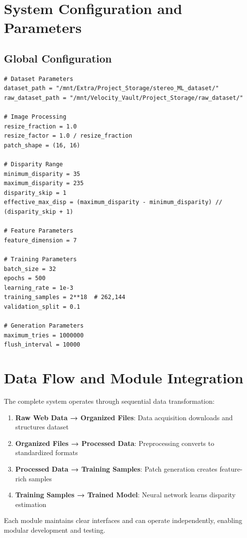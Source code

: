 \documentclass[12pt]{article}
\begin{document}
\section{System Configuration and Parameters}

\subsection{Global Configuration}

\begin{verbatim}
# Dataset Parameters
dataset_path = "/mnt/Extra/Project_Storage/stereo_ML_dataset/"
raw_dataset_path = "/mnt/Velocity_Vault/Project_Storage/raw_dataset/"

# Image Processing
resize_fraction = 1.0
resize_factor = 1.0 / resize_fraction
patch_shape = (16, 16)

# Disparity Range
minimum_disparity = 35
maximum_disparity = 235
disparity_skip = 1
effective_max_disp = (maximum_disparity - minimum_disparity) // (disparity_skip + 1)

# Feature Parameters
feature_dimension = 7

# Training Parameters
batch_size = 32
epochs = 500
learning_rate = 1e-3
training_samples = 2**18  # 262,144
validation_split = 0.1

# Generation Parameters
maximum_tries = 1000000
flush_interval = 10000
\end{verbatim}

\section{Data Flow and Module Integration}

The complete system operates through sequential data transformation:

\begin{enumerate}
\item \textbf{Raw Web Data → Organized Files}: Data acquisition downloads and structures dataset
\item \textbf{Organized Files → Processed Data}: Preprocessing converts to standardized formats
\item \textbf{Processed Data → Training Samples}: Patch generation creates feature-rich samples  
\item \textbf{Training Samples → Trained Model}: Neural network learns disparity estimation
\end{enumerate}

Each module maintains clear interfaces and can operate independently, enabling modular development and testing.
\end{document}

